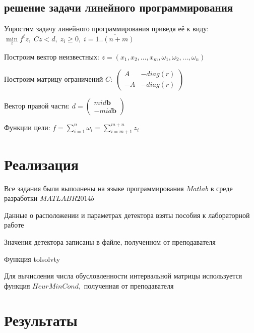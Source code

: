 \documentclass[a4]{article}
\begin{document}
\subsection{решение задачи линейного программирования}
Упростим задачу линейного программирования приведя её к виду:  $\min\limits_zf^tz,\; Cz<d,\;z_i\geq0,\;i=\overline{1..(n+m)}$

Построим вектор неизвестных: $z=(x_1,x_2,\ldots,x_m,\omega_1,\omega_2,\ldots,\omega_n)$

Построим матрицу ограничений $C:\;\begin{pmatrix}
A & -diag(r)\\
-A & -diag(r)
\end{pmatrix}$

Вектор правой части: $d=\begin{pmatrix}
mid \mathbf{b}\\
-mid \mathbf{b}
\end{pmatrix}$

Функции цели: $f=\sum\limits_{i=1}^n\omega_i=\sum\limits_{i=m+1}^{m+n}z_i$
\section{Реализация}
Все задания были выполнены на языке программирования $Matlab$ в среде разработки $MATLAB R2014b$ \hfill \cite{1}

Данные о расположении и параметрах детектора взяты пособия к лабораторной работе \hfill\cite{source2}

Значения детектора записаны в файле, полученном от преподавателя

Функция tolsolvty \hfill \cite{tolsolvty}

Для вычисления числа обусловленности интервальной матрицы используется функция $HeurMinCond,$ полученная от преподавателя

\section{Результаты}
\end{document}
